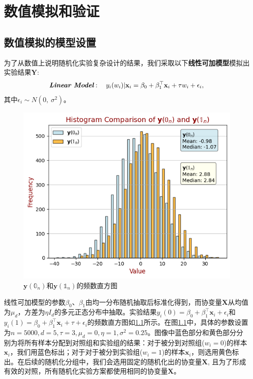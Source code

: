 
\chapter{数值模拟和验证}\label{chap:4}

\section{数值模拟的模型设置}

为了从数值上说明随机化实验复杂设计的结果，我们采取以下\textbf{线性可加模型}模拟出实验结果$\mathbf{Y}$:
    \begin{equation}\label{linear Model}
        \textit{\textbf{Linear Model}}:\quad y_i (w_i) | \mathbf{x}_i = \beta_0 + \beta_1^{\top}\mathbf{x}_i+\tau w_i + \epsilon_i,
    \end{equation}
    其中$\epsilon_i \sim N(0,\ \sigma^2)$。

\begin{figure}[!htbp]
    \centering
    \includegraphics[width=0.75\linewidth]{figures/distributionOfy.png}
    \caption{$\mathbf{y}(\mathbb{0}_n)$和$\mathbf{y}(\mathbb{1}_n)$的频数直方图}
    \label{fig:distributionOfy}
\end{figure}

线性可加模型的参数$\beta_0$、$\beta_1$由均一分布随机抽取后标准化得到，而协变量$\mathbf{X}$从均值为$\mu_d$，方差为$\eta I_d$的多元正态分布中抽取。实验结果$y_i(0)=\beta_0 + \beta_1^{\top}\mathbf{x}_i+ \epsilon_i$和$y_i(1)=\beta_0 + \beta_1^{\top}\mathbf{x}_i+\tau + \epsilon_i$的频数直方图如\ref{fig:distributionOfy}所示。在图\ref{fig:distributionOfy}中，具体的参数设置为$n=5000, d=5, \tau=3, \mu_d = 0, \eta=1, \sigma^2=0.25$。图像中蓝色部分和黄色部分分别为将所有样本分配到对照组和实验组的结果：对于被分到对照组($w_i=0$)的样本$\mathbf{x}_i$，我们用蓝色标出；对于对于被分到实验组($w_i=1$)的样本$\mathbf{x}_i$，则选用黄色标出。在后续的随机化分组中，我们会选用固定的随机化出的协变量$\mathbf{X}$, 且为了形成有效的对照，所有随机化实验方案都使用相同的协变量$\mathbf{X}$。


